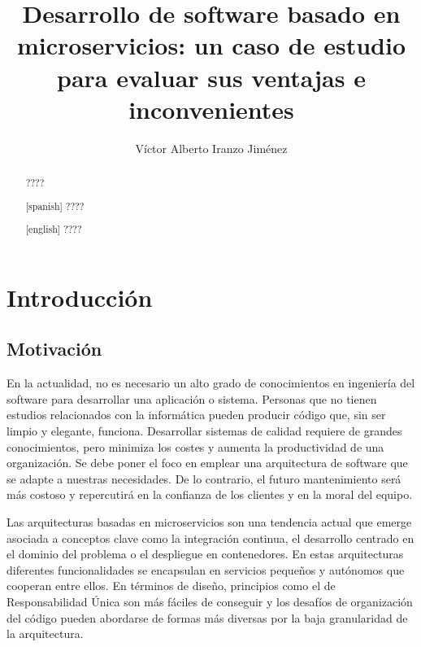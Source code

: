 \documentclass[11pt,spanish,listoffigures]{tfgetsinf}
\title{ Desarrollo de software basado en microservicios: un caso de estudio para evaluar sus ventajas e inconvenientes }
\author{Víctor Alberto Iranzo Jiménez}
\begin{document}

\begin{abstract}
????
\end{abstract}
\begin{abstract}[spanish]
????
\end{abstract}
\begin{abstract}[english]
????
\end{abstract}


\mainmatter


\chapter{Introducci\'on}

\section{Motivaci\'on}

En la actualidad, no es necesario un alto grado de conocimientos en ingeniería del software para desarrollar una aplicación o sistema. Personas que no tienen estudios relacionados con la informática pueden producir código que, sin ser limpio y elegante, funciona. Desarrollar sistemas de calidad requiere de grandes conocimientos, pero minimiza los costes y aumenta la productividad de una organización. Se debe poner el foco en emplear una arquitectura de software que se adapte a nuestras necesidades. De lo contrario, el futuro mantenimiento será más costoso y repercutirá en la confianza de los clientes y en la moral del equipo. \cite{Martin2017}

Las arquitecturas basadas en microservicios son una tendencia actual que emerge asociada a conceptos clave como la integración continua, el desarrollo centrado en el dominio del problema o el despliegue en contenedores. En estas arquitecturas diferentes funcionalidades se encapsulan en servicios pequeños y autónomos que cooperan entre ellos. En términos de diseño, principios como el de Responsabilidad Única son más fáciles de conseguir y los desafíos de organización del código pueden abordarse de formas más diversas por la baja granularidad de la arquitectura. 
\end{document}

